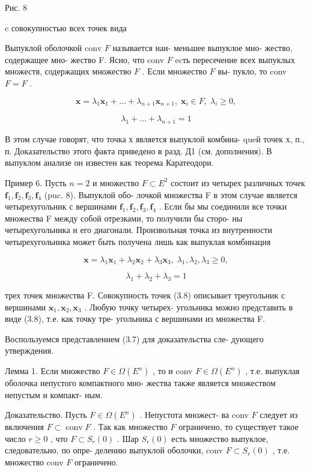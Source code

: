 \documentclass[8pt]{extarticle}
\begin{document}
Рис. 8

c совокупностью всех точек вида

Выпуклой оболочкой conv \(F\) называется наи- меньшее выпуклое мно- жество, содержащее мно- жество F. Ясно, что conv \(F\) ecть пересечение всех выпуклых множеств, содержащих множество \(F\) . Если множество \(F\) вы- пукло, то conv \(F = F\) .

\[
\mathbf{x} = {\lambda }_{1}{\mathbf{x}}_{1} + \ldots  + {\lambda }_{n + 1}{\mathbf{x}}_{n + 1},\;{\mathbf{x}}_{i} \in  F,\;{\lambda }_{i} \geq  0,
\]

\[
{\lambda }_{1} + \ldots  + {\lambda }_{n + 1} = 1 \tag{3.7}
\]

В этом случае говорят, что точка х является выпуклой комбина- queй точек х, п., п. Доказательство этого факта приведено в разд. Д1 (см. дополнения). В выпуклом анализе он известен как теорема Каратеодори.

Пример 6. Пусть \(n = 2\) и множество \(F \subset  {E}^{2}\) состоит из четырех различных точек \({\mathbf{f}}_{1},{\mathbf{f}}_{2},{\mathbf{f}}_{3},{\mathbf{f}}_{4}\) (puc. 8). Выпуклой обо- лочкой множества F в этом случае является четырехугольник с вершинами \({\mathbf{f}}_{1},{\mathbf{f}}_{2},{\mathbf{f}}_{3},{\mathbf{f}}_{4}\) . Если бы мы соединили все точки множества F между собой отрезками, то получили бы сторо- ны четырехугольника и его диагонали. Произвольная точка из внутренности четырехугольника может быть получена лишь как выпуклая комбинация

\[
\mathbf{x} = {\lambda }_{1}{\mathbf{x}}_{1} + {\lambda }_{2}{\mathbf{x}}_{2} + {\lambda }_{3}{\mathbf{x}}_{3},\;{\lambda }_{1},{\lambda }_{2},{\lambda }_{3} \geq  0,
\]

\[
{\lambda }_{1} + {\lambda }_{2} + {\lambda }_{3} = 1 \tag{3.8}
\]

трех точек множества F. Совокупность точек (3.8) описывает треугольник с вершинами \({\mathbf{x}}_{1},{\mathbf{x}}_{2},{\mathbf{x}}_{3}\) . Любую точку четырех- угольника можно представить в виде (3.8), т.е. как точку тре- угольника с вершинами из множества F.

Воспользуемся представлением (3.7) для доказательства сле- дующего утверждения.

Лемма 1. Если множество \(F \in  \Omega \left( {E}^{n}\right)\) , то и conv \(F \in  \Omega \left( {E}^{n}\right)\) , т.е. выпуклая оболочка непустого компактного мно- жества также является множеством непустым и компакт- ным.

Доказательство. Пусть \(F \in  \Omega \left( {E}^{n}\right)\) . Непустота множест- ва conv \(F\) следует из включения \(F \subset  \operatorname{conv}F\) . Так как множество \(F\) ограничено, то существует такое число \(r \geq  0\) , что \(F \subset  {S}_{r}\left( 0\right)\) . Шар \({S}_{r}\left( 0\right)\) есть множество выпуклое, следовательно, по опре- делению выпуклой оболочки, conv \(F \subset  {S}_{r}\left( 0\right)\) , т.е. множество conv \(F\) ограничено.
\end{document}
